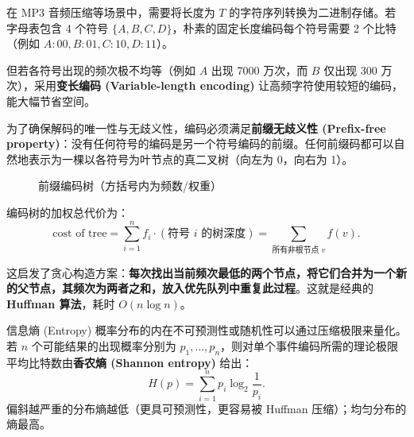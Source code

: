 在 MP3 音频压缩等场景中，需要将长度为 $T$ 的字符序列转换为二进制存储。若字母表包含 4 个符号 $\{A, B, C, D\}$，朴素的固定长度编码每个符号需要 2 个比特（例如 $A: 00, B: 01, C: 10, D: 11$）。

但若各符号出现的频次极不均等（例如 $A$ 出现 7000 万次，而 $B$ 仅出现 300 万次），采用\textbf{变长编码 (Variable-length encoding)} 让高频字符使用较短的编码，能大幅节省空间。

为了确保解码的唯一性与无歧义性，编码必须满足\textbf{前缀无歧义性 (Prefix-free property)}：没有任何符号的编码是另一个符号编码的前缀。任何前缀码都可以自然地表示为一棵以各符号为叶节点的真二叉树（向左为 0，向右为 1）。

\begin{figure}[htbp]
\centering
{}
\caption{前缀编码树（方括号内为频数/权重）}
\label{fig:huffman_tree_demo}
\end{figure}

编码树的加权总代价为：
\[
\text{cost of tree} = \sum_{i=1}^n f_i \cdot (\text{符号 } i \text{ 的树深度}) = \sum_{\text{所有非根节点 } v} f(v).
\]

这启发了贪心构造方案：\textbf{每次找出当前频次最低的两个节点，将它们合并为一个新的父节点，其频次为两者之和，放入优先队列中重复此过程}。这就是经典的 \textbf{Huffman 算法}，耗时 $O(n \log n)$。

\begin{sidebarbox}{信息熵 (Entropy)}
概率分布的内在不可预测性或随机性可以通过压缩极限来量化。若 $n$ 个可能结果的出现概率分别为 $p_1, \dots, p_n$，则对单个事件编码所需的理论极限平均比特数由\textbf{香农熵 (Shannon entropy)} 给出：
\[
H(p) = \sum_{i=1}^n p_i \log_2 \frac{1}{p_i}.
\]
偏斜越严重的分布熵越低（更具可预测性，更容易被 Huffman 压缩）；均匀分布的熵最高。
\end{sidebarbox}


